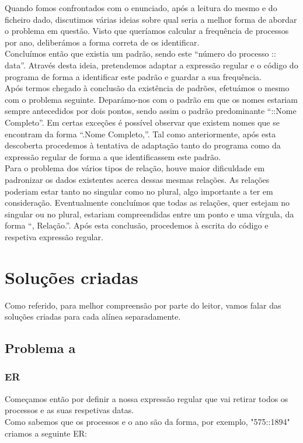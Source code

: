 \documentclass[11pt,a4paper]{report}%
\begin{document}
Quando fomos confrontados com o enunciado, após a leitura do mesmo e do ficheiro dado, discutimos várias ideias sobre qual seria a melhor forma de abordar o problema em questão. Visto que queríamos calcular a frequência de processos por ano, deliberámos a forma correta de os identificar. \\
Concluímos então que existia um padrão, sendo este “número do processo :: data”. Através desta ideia, pretendemos adaptar a expressão regular e o código do programa de forma a identificar este padrão e guardar a sua frequência.\\
Após termos chegado à conclusão da existência de padrões, efetuámos o mesmo com o problema seguinte. Deparámo-nos com o padrão em que os nomes estariam sempre antecedidos por dois pontos, sendo assim o padrão predominante “::Nome Completo”. Em certas exceções é possível observar que existem nomes que se encontram da forma “.Nome Completo,”. Tal como anteriormente, após esta descoberta procedemos à tentativa de adaptação tanto do programa como da expressão regular de forma a que identificassem este padrão.\\
Para o problema dos vários tipos de relação, houve maior dificuldade em padronizar os dados existentes acerca dessas mesmas relações. As relações poderiam estar tanto no singular como no plural, algo importante a ter em consideração. Eventualmente concluímos que todas as relações, quer estejam no singular ou no plural, estariam compreendidas entre um ponto e uma vírgula, da forma “, Relação.”. Após esta conclusão, procedemos à escrita do código e respetiva expressão regular.

\newpage

\chapter{Soluções criadas}
Como referido, para melhor compreensão por parte do leitor, vamos falar das soluções criadas para cada alínea separadamente.
\section{Problema a}

\subsection{ER}

Começamos então por definir a nossa expressão regular que vai retirar todos os processos e as suas respetivas datas.\\
Como sabemos que os processos e o ano são da forma, por exemplo, "575::1894" criamos a seguinte ER:
\end{document}
